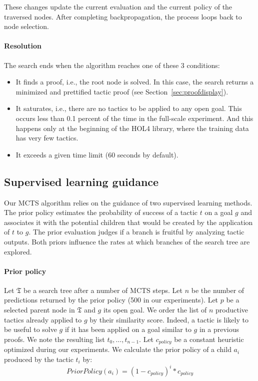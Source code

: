 \documentclass[runningheads,a4paper,draft]{svjour3}
\def\holfour{\textsf{HOL4}\xspace}
\begin{document}
These changes update the current evaluation and the current policy of the
traversed nodes.
After completing backpropagation, the process loops back to node
selection.

\paragraph{Resolution}
The search ends when the algorithm reaches one of these 3 conditions:
\begin{itemize}
\item It finds a proof, i.e., the root node is solved. In this case,
the search returns a minimized and
prettified tactic proof (see Section~\ref{sec:proofdisplay}).
\item It saturates, i.e., there are no tactics to be applied to any open goal.
This occurs less than 0.1 percent of the time in the full-scale experiment.
And this happens only at the beginning of the \holfour library, where the
training
data
has very few tactics.
\item It exceeds a given time limit (60 seconds by default).
\end{itemize}

\subsection{Supervised learning guidance}
Our MCTS algorithm relies on the guidance of two supervised learning methods.
The prior policy estimates the probability of success of a tactic $t$ on a
goal $g$ and associates it with the potential children that would be created by
the
application of $t$ to $g$. The prior evaluation judges if a branch is fruitful
by analyzing tactic
outputs. Both priors influence the rates at which branches of the search tree
are explored.

\paragraph{Prior policy}\label{sec:policy}
Let $\mathfrak{T}$ be a search tree after a number of MCTS steps.
Let $n$ be the number of predictions returned by the prior policy (500 in our 
experiments).
Let $p$ be a selected parent node in $\mathfrak{T}$ and $g$ its open goal. We 
order the list of $n$ productive tactics already
applied to $g$ by their similarity score. Indeed, a tactic is likely to 
be useful to solve $g$ if it has been applied on a goal similar to 
$g$ in a previous proofs. 
We note the resulting list
$t_0,\ldots,t_{n-1}$.
Let $c_{\mathit{policy}}$ be a constant heuristic optimized during our experiments.
We calculate the prior policy of a child $a_i$ produced by the tactic
$t_i$ by:
\[\mathit{PriorPolicy}(a_i) = (1 - c_{\mathit{policy}})^{i} * c_{\mathit{policy}}\]
\end{document}

